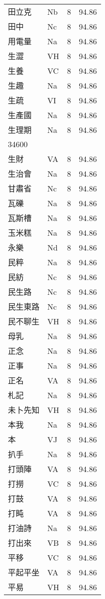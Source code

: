 \documentclass[twocolumn]{book}
\begin{document}
\begin{supertabular}{llrr}
田立克 & Nb & 8 &  94.86\\
田中 & Nc & 8 &  94.86\\
用電量 & Na & 8 &  94.86\\
生澀 & VH & 8 &  94.86\\
生養 & VC & 8 &  94.86\\
生趣 & Na & 8 &  94.86\\
生疏 & VI & 8 &  94.86\\
生產國 & Na & 8 &  94.86\\
生理期 & Na & 8 &  94.86\\
34600\\
生財 & VA & 8 &  94.86\\
生治會 & Na & 8 &  94.86\\
甘肅省 & Nc & 8 &  94.86\\
瓦礫 & Na & 8 &  94.86\\
瓦斯槽 & Na & 8 &  94.86\\
玉米糕 & Na & 8 &  94.86\\
永樂 & Nd & 8 &  94.86\\
民粹 & Na & 8 &  94.86\\
民紡 & Nc & 8 &  94.86\\
民生路 & Nc & 8 &  94.86\\
民生東路 & Nc & 8 &  94.86\\
民不聊生 & VH & 8 &  94.86\\
母乳 & Na & 8 &  94.86\\
正念 & Na & 8 &  94.86\\
正事 & Na & 8 &  94.86\\
正名 & VA & 8 &  94.86\\
札記 & Na & 8 &  94.86\\
未卜先知 & VH & 8 &  94.86\\
本我 & Na & 8 &  94.86\\
本 & VJ & 8 &  94.86\\
扒手 & Na & 8 &  94.86\\
打頭陣 & VA & 8 &  94.86\\
打撈 & VC & 8 &  94.86\\
打鼓 & VA & 8 &  94.86\\
打盹 & VA & 8 &  94.86\\
打油詩 & Na & 8 &  94.86\\
打出來 & VB & 8 &  94.86\\
平移 & VC & 8 &  94.86\\
平起平坐 & VA & 8 &  94.86\\
平易 & VH & 8 &  94.86\\

\end{supertabular}
\end{document}
